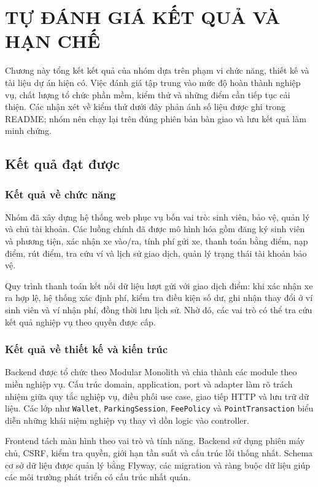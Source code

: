 \chapter{TỰ ĐÁNH GIÁ KẾT QUẢ VÀ HẠN CHẾ}

Chương này tổng kết kết quả của nhóm dựa trên phạm vi chức năng, thiết kế và tài liệu dự án hiện có. Việc đánh giá tập trung vào mức độ hoàn thành nghiệp vụ, chất lượng tổ chức phần mềm, kiểm thử và những điểm cần tiếp tục cải thiện. Các nhận xét về kiểm thử dưới đây phản ánh số liệu được ghi trong README; nhóm nên chạy lại trên đúng phiên bản bàn giao và lưu kết quả làm minh chứng.

\section{Kết quả đạt được}

\subsection{Kết quả về chức năng}
Nhóm đã xây dựng hệ thống web phục vụ bốn vai trò: sinh viên, bảo vệ, quản lý và chủ tài khoản. Các luồng chính đã được mô hình hóa gồm đăng ký sinh viên và phương tiện, xác nhận xe vào/ra, tính phí gửi xe, thanh toán bằng điểm, nạp điểm, rút điểm, tra cứu ví và lịch sử giao dịch, quản lý trạng thái tài khoản bảo vệ.

Quy trình thanh toán kết nối dữ liệu lượt gửi với giao dịch điểm: khi xác nhận xe ra hợp lệ, hệ thống xác định phí, kiểm tra điều kiện số dư, ghi nhận thay đổi ở ví sinh viên và ví nhận phí, đồng thời lưu lịch sử. Nhờ đó, các vai trò có thể tra cứu kết quả nghiệp vụ theo quyền được cấp.

\subsection{Kết quả về thiết kế và kiến trúc}
Backend được tổ chức theo Modular Monolith và chia thành các module theo miền nghiệp vụ. Cấu trúc domain, application, port và adapter làm rõ trách nhiệm giữa quy tắc nghiệp vụ, điều phối use case, giao tiếp HTTP và lưu trữ dữ liệu. Các lớp như \texttt{Wallet}, \texttt{ParkingSession}, \texttt{FeePolicy} và \texttt{PointTransaction} biểu diễn những khái niệm nghiệp vụ thay vì dồn logic vào controller.

Frontend tách màn hình theo vai trò và tính năng. Backend sử dụng phiên máy chủ, CSRF, kiểm tra quyền, giới hạn tần suất và cấu trúc lỗi thống nhất. Schema cơ sở dữ liệu được quản lý bằng Flyway, các migration và ràng buộc dữ liệu giúp các môi trường phát triển có cấu trúc nhất quán.

